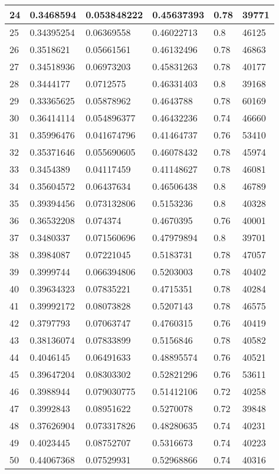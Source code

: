 \begin{longtable}{|l|l|l|l|l|l|}
24 & 0.3468594 & 0.053848222 & 0.45637393 & 0.78 & 39771 \\ \hline 
25 & 0.34395254 & 0.06369558 & 0.46022713 & 0.8 & 46125 \\ \hline 
26 & 0.3518621 & 0.05661561 & 0.46132496 & 0.78 & 46863 \\ \hline 
27 & 0.34518936 & 0.06973203 & 0.45831263 & 0.78 & 40177 \\ \hline 
28 & 0.3444177 & 0.0712575 & 0.46331403 & 0.8 & 39168 \\ \hline 
29 & 0.33365625 & 0.05878962 & 0.4643788 & 0.78 & 60169 \\ \hline 
30 & 0.36414114 & 0.054896377 & 0.46432236 & 0.74 & 46660 \\ \hline 
31 & 0.35996476 & 0.041674796 & 0.41464737 & 0.76 & 53410 \\ \hline 
32 & 0.35371646 & 0.055690605 & 0.46078432 & 0.78 & 45974 \\ \hline 
33 & 0.3454389 & 0.04117459 & 0.41148627 & 0.78 & 46081 \\ \hline 
34 & 0.35604572 & 0.06437634 & 0.46506438 & 0.8 & 46789 \\ \hline 
35 & 0.39394456 & 0.073132806 & 0.5153236 & 0.8 & 40328 \\ \hline 
36 & 0.36532208 & 0.074374 & 0.4670395 & 0.76 & 40001 \\ \hline 
37 & 0.3480337 & 0.071560696 & 0.47979894 & 0.8 & 39701 \\ \hline 
38 & 0.3984087 & 0.07221045 & 0.5183731 & 0.78 & 47057 \\ \hline 
39 & 0.3999744 & 0.066394806 & 0.5203003 & 0.78 & 40402 \\ \hline 
40 & 0.39634323 & 0.07835221 & 0.4715351 & 0.78 & 40284 \\ \hline 
41 & 0.39992172 & 0.08073828 & 0.5207143 & 0.78 & 46575 \\ \hline 
42 & 0.3797793 & 0.07063747 & 0.4760315 & 0.76 & 40419 \\ \hline 
43 & 0.38136074 & 0.07833899 & 0.5156846 & 0.78 & 40582 \\ \hline 
44 & 0.4046145 & 0.06491633 & 0.48895574 & 0.76 & 40521 \\ \hline 
45 & 0.39647204 & 0.08303302 & 0.52821296 & 0.76 & 53611 \\ \hline 
46 & 0.3988944 & 0.079030775 & 0.51412106 & 0.72 & 40258 \\ \hline 
47 & 0.3992843 & 0.08951622 & 0.5270078 & 0.72 & 39848 \\ \hline 
48 & 0.37626904 & 0.073317826 & 0.48280635 & 0.74 & 40231 \\ \hline 
49 & 0.4023445 & 0.08752707 & 0.5316673 & 0.74 & 40223 \\ \hline 
50 & 0.44067368 & 0.07529931 & 0.52968866 & 0.74 & 40316 \\ \hline 
\end{longtable}